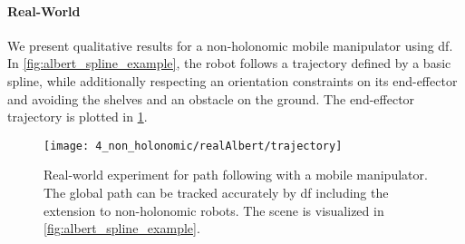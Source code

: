 \paragraph{Real-World}
We present qualitative results for a non-holonomic mobile manipulator using \ac{df}.
In \cref{fig:albert_spline_example}, the robot follows a trajectory defined by a basic spline,
while additionally respecting an orientation constraints on its end-effector and avoiding
the shelves and an obstacle on the ground. The end-effector trajectory is plotted in \cref{fig:albert_spline_trajectory}.
%
\begin{figure}[t!]
    \centering
    \texttt{[image: 4\_non\_holonomic/realAlbert/trajectory]}
    \caption{Real-world experiment for path following with a mobile manipulator. The global path can be tracked
        accurately by \ac{df} including the extension to non-holonomic robots. The scene 
        is visualized in \cref{fig:albert_spline_example}.}
    \label{fig:albert_spline_trajectory}
\end{figure}
%
\iffalse
%
\begin{figure}[h]
  \centering
  \texttt{[image: 4\_non\_holonomic/realAlbert/motion\_in\_frame]}
  \caption{Trajectory following with mobile manipulator. \MS{This needs to be redone \ldots}}%
  \label{fig:albert_trajectory_following}
\end{figure}
%
\fi
